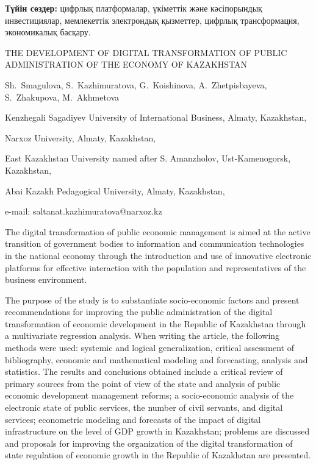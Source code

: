 {\bfseries Түйін сөздер:} цифрлық платформалар, үкіметтік және кәсіпорындық
инвестициялар, мемлекеттік электрондық қызметтер, цифрлық трансформация,
экономикалық басқару.

\begin{header}
THE DEVELOPMENT OF DIGITAL TRANSFORMATION OF PUBLIC ADMINISTRATION OF THE ECONOMY OF KAZAKHSTAN

Sh.~Smagulova,
S.~Kazhimuratova\envelope,
G.~Koishinova,
A.~Zhetpisbayeva,
S.~Zhakupova,
M.~Akhmetova
\end{header}

\begin{affil}
Kenzhegali Sagadiyev University of International Business, Almaty, Kazakhstan,

Narxoz University, Almaty, Kazakhstan,

East Kazakhstan University named after S. Amanzholov, Ust-Kamenogorsk, Kazakhstan,

Abai Kazakh Pedagogical University, Almaty, Kazakhstan,

e-mail: saltanat.kazhimuratova@narxoz.kz
\end{affil}

The digital transformation of public economic management is aimed at the
active transition of govern\-ment bodies to information and communication
technologies in the national economy through the intro\-duction and use of
innovative electronic platforms for effective interaction with the
population and repre\-sentatives of the business environment.

The purpose of the study is to substantiate socio-economic factors and
present recommendations for improving the public administration of the
digital transformation of economic development in the Republic of
Kazakhstan through a multivariate regression analysis. When writing the
article, the following methods were used: systemic and logical
generalization, critical assessment of bibliography, economic and
mathe\-matical modeling and forecasting, analysis and statistics. The
results and conclusions obtained include a critical review of primary
sources from the point of view of the state and analysis of public
economic development management reforms; a socio-economic analysis of
the electronic state of public services, the number of civil servants,
and digital services; econometric modeling and forecasts of the impact
of digital infrastructure on the level of GDP growth in Kazakhstan;
problems are discussed and proposals for improving the organization of
the digital transformation of state regulation of economic growth in the
Republic of Kazakhstan are presented.

